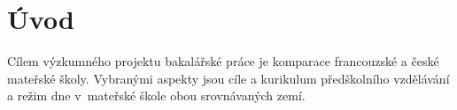 \chapter{Úvod}

Cílem výzkumného projektu bakalářské práce je komparace francouzské a české mateřské školy. Vybranými aspekty jsou cíle a kurikulum předškolního vzdělávání a režim dne v mateřské škole obou srovnávaných zemí. 